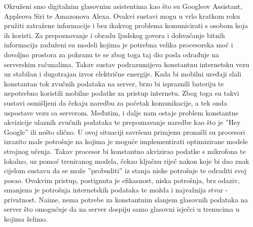 Okruženi smo digitalnim glasovnim asistentima kao što su Googleov Assistant,
Appleova Siri te Amazonova Alexa. Ovakvi sustavi mogu u vrlo kratkom
roku pružiti zatražene informacije i bez ikakvog problema komunicirati s osobom
koja ih koristi. Za prepoznavanje i obradu ljudskog govora i dohvaćanje bitnih
informacija zaduženi su modeli kojima je potrebna velika procesorska moć i dovoljno
prostora za pohranu te se zbog toga taj dio posla odrađuje na serverskim računalima.
Takav sustav podrazumijeva konstantnu internetsku vezu uz stabilan i dugotrajan
izvor električne energije. Kada bi mobilni uređaji slali konstantan tok zvučnih podataka
na server, brzo bi ispraznili bateriju te nepotrebno koristili mobilne podatke za
pristup internetu. Zbog toga su takvi sustavi osmišljeni da čekaju naredbu za
početak komunikacije, a tek onda uspostave vezu sa serverom. Međutim, i dalje
nam ostaje problem konstantne akvizicije ulaznih zvučnih podataka te prepoznavanje
naredbe kao što je ”Hey Google” ili nešto slično. U ovoj situaciji savršenu primjenu
pronašli su procesori izrazito male potrošnje na kojima je moguće implementirati
optimizirane modele strojnog učenja. Takav procesor bi konstantno akvizirao podatke
s mikrofona te lokalno, uz pomoć treniranog modela, čekao ključnu riječ nakon
koje bi dao znak cijelom sustavu da se može ”probuditi” iz stanja niske
potrošnje te odraditi svoj posao. Ovakvim pristup, postignuta je efikasnost, niska
potrošnja, brz odaziv, smanjena je potrošnja internetskih podataka te možda i
najvažnija stvar - privatnost. Naime, nema potrebe za konstantnim slanjem glasovnih
podataka na server što omogućuje da na server dospiju samo glasovni isječci u
trenucima u kojima želimo.
